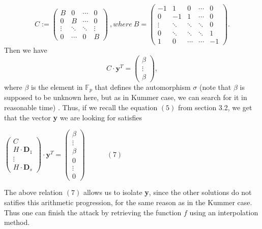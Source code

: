 \documentclass[10pt]{article}
\newcommand{\cd}{\cdot}
\begin{document}
\begin{equation*}
C := 
\begin{pmatrix}
B & 0 & \cdots & 0 \\
0 & B & \cdots & 0 \\
\vdots & \ddots & \ddots & \vdots \\
0 & \cdots & 0 & B
\end{pmatrix} \ , where \ 
B = 
\begin{pmatrix}
-1 & 1 & 0 & \cdots & 0 \\
0 & -1 & 1 & \cdots & 0 \\
\vdots & \ddots & \ddots & \ddots & 0 \\
0 & \ddots & \ddots & \ddots & 1 \\
1 & 0 & \cdots & \cdots & -1
\end{pmatrix}.
\end{equation*}
 Then we have
\begin{equation*}
C \cd \textbf{y}^T
= 
\begin{pmatrix}
\beta \\
\vdots \\
\beta
\end{pmatrix},
\end{equation*}
where $\beta$ is the element in $\mathbb{F}_p$ that defines the automorphism $\sigma$ (note that $\beta$ is supposed to be unknown here, but as in Kummer case, we can search for it in reasonable time) . Thus, if we recall the equation $(5)$ from section 3.2, we get that the vector \textbf{y} we are looking for satisfies

\begin{center}
$\begin{pmatrix}
C\\
H \cd \textbf{D}_1 \\
\vdots \\
H \cd \textbf{D}_s
\end{pmatrix}
\cd \textbf{y}^T = 
\begin{pmatrix}
\beta \\
\vdots \\
\beta \\
0 \\
\vdots \\
0
\end{pmatrix} \quad \quad \quad (7)$
\end{center}

The above relation $(7)$ allows us to isolate \textbf{y}, since the other solutions do not satifies this arithmetic progression, for the same reason as in the Kummer case. Thus one can finish the attack by retrieving the function $f$ using an interpolation method. 
\end{document}
